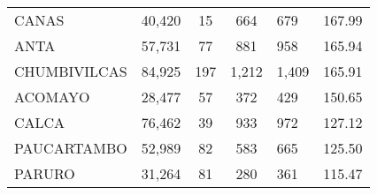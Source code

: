 \begin{tabular}{lrcclr}
	\cellcolor[HTML]{FFFF99}CANAS                                  & 40,420                                                         & 15                                                         & 664                  & 679                                                                 & 167.99                                                                       \\
	\cellcolor[HTML]{FFFF99}ANTA                                   & 57,731                                                         & 77                                                         & 881                  & 958                                                                 & 165.94                                                                       \\
	\cellcolor[HTML]{C6E0B4}CHUMBIVILCAS                           & 84,925                                                         & 197                                                        & 1,212                & 1,409                                                               & 165.91                                                                       \\
	\cellcolor[HTML]{C6E0B4}ACOMAYO                                & 28,477                                                         & 57                                                         & 372                  & 429                                                                 & 150.65                                                                       \\
	\cellcolor[HTML]{C6E0B4}CALCA                                  & 76,462                                                         & 39                                                         & 933                  & 972                                                                 & 127.12                                                                       \\
	\cellcolor[HTML]{C6E0B4}PAUCARTAMBO                            & 52,989                                                         & 82                                                         & 583                  & 665                                                                 & 125.50                                                                       \\
	\cellcolor[HTML]{C6E0B4}PARURO                                 & 31,264                                                         & 81                                                         & 280                  & 361                                                                 & 115.47                                                                       \\

\end{tabular}
